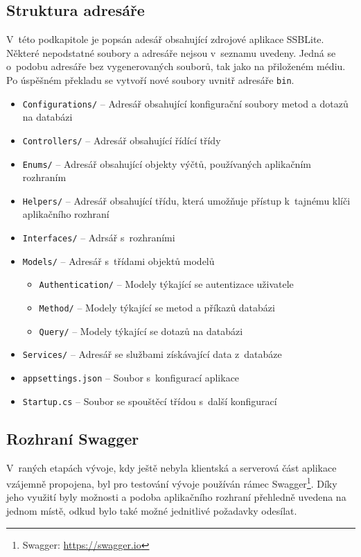 \subsection{Struktura adresáře}
V~této podkapitole je popsán adesář obsahující zdrojové aplikace SSBLite. Některé nepodstatné soubory a adresáře nejsou v~seznamu uvedeny. Jedná se o~podobu adresáře bez vygenerovaných souborů, tak jako na přiloženém médiu. Po úspěšném překladu se vytvoří nové soubory uvnitř adresáře \texttt{bin}.

\begin{itemize}
  \item \texttt{Configurations/} -- Adresář obsahující konfigurační soubory metod a dotazů na databázi
  \item \texttt{Controllers/} -- Adresář obsahující řídící třídy
  \item \texttt{Enums/} -- Adresář obsahující objekty výčtů, používaných aplikačním rozhraním
  \item \texttt{Helpers/} -- Adresář obsahující třídu, která umožňuje přístup k~tajnému klíči aplikačního rozhraní
  \item \texttt{Interfaces/} -- Adrsář s~rozhraními
  \item \texttt{Models/} -- Adresář s~třídami objektů modelů
  \begin{itemize}
    \item \texttt{Authentication/} -- Modely týkající se autentizace uživatele
    \item \texttt{Method/} -- Modely týkající se metod a příkazů databázi
    \item \texttt{Query/} -- Modely týkající se dotazů na databázi 
  \end{itemize}
  \item \texttt{Services/} -- Adresář se službami získávající data z~databáze
  \item \texttt{appsettings.json} -- Soubor s~konfigurací aplikace
  \item \texttt{Startup.cs} -- Soubor se spouštěcí třídou s~další konfigurací
\end{itemize}


\subsection{Rozhraní Swagger}
V~raných etapách vývoje, kdy ještě nebyla klientská a serverová část aplikace vzájemně propojena, byl pro testování vývoje používán rámec Swagger\footnote{Swagger: \url{https://swagger.io}}. Díky jeho využití byly možnosti a podoba aplikačního rozhraní přehledně uvedena na jednom místě, odkud bylo také možné jednitlivé požadavky odesílat.


